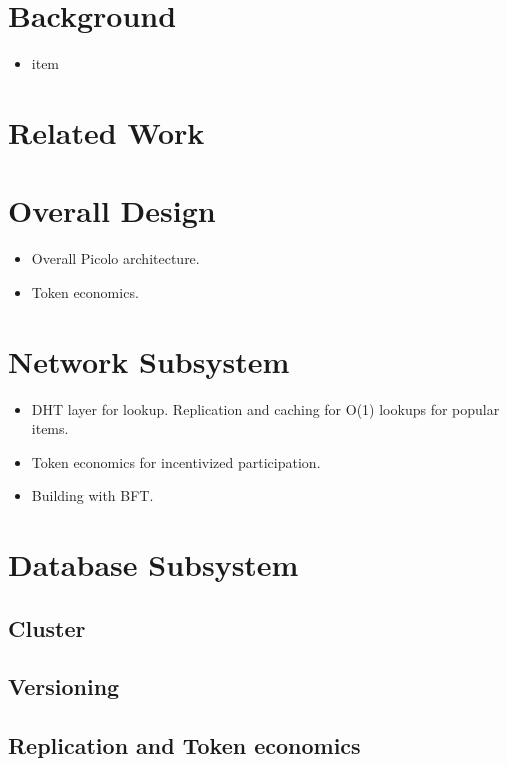 \documentclass[preprint,12pt]{elsarticle}
\begin{document}
\section{Background}
    \begin{itemize}
        \item item
    \end{itemize}

\section{Related Work}
\section{Overall Design}

    \begin{itemize}
        \item Overall Picolo architecture.
        \item Token economics.
    \end{itemize}
\section{Network Subsystem}

    \begin{itemize}
        \item DHT layer for lookup. Replication and caching for O(1) lookups for popular items.
        \item Token economics for incentivized participation.
        \item Building with BFT.
    \end{itemize}
\section{Database Subsystem}

\subsection{Cluster}
\subsection{Versioning}
\subsection{Replication and Token economics}
\end{document}
